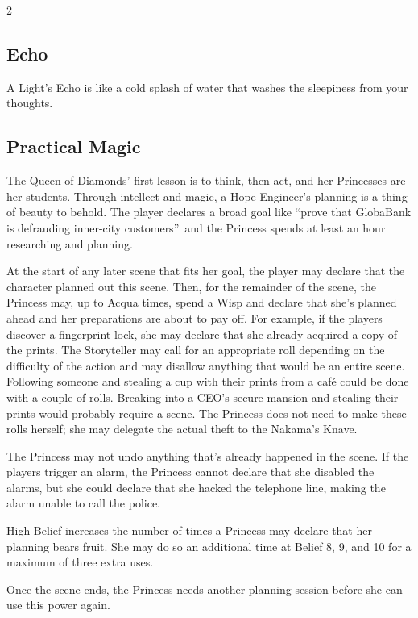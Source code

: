 \begin{multicols}{2}
\subsection*{Echo}
A Light's Echo is like a cold splash of water that washes the sleepiness from your thoughts.

\subsection*{Practical Magic}

The Queen of Diamonds' first lesson is to think, then act, and her Princesses are her students. Through intellect and magic, a Hope-Engineer's planning is a thing of beauty to behold. The player declares a broad goal like \textquotedblleft prove that GlobaBank is defrauding inner-city customers\textquotedblright\, and the Princess spends at least an hour researching and planning. 

At the start of any later scene that fits her goal, the player may declare that the character planned out this scene. Then, for the remainder of the scene, the Princess may, up to Acqua times, spend a Wisp and declare that she's planned ahead and her preparations are about to pay off. For example, if the players discover a fingerprint lock, she may declare that she already acquired a copy of the prints. The Storyteller may call for an appropriate roll depending on the difficulty of the action and may disallow anything that would be an entire scene. Following someone and stealing a cup with their prints from a caf\'{e} could be done with a couple of rolls. Breaking into a CEO's secure mansion and stealing their prints would probably require a scene. The Princess does not need to make these rolls herself; she may delegate the actual theft to the Nakama's Knave. 

The Princess may not undo anything that's already happened in the scene. If the players trigger an alarm, the Princess cannot declare that she disabled the alarms, but she could declare that she hacked the telephone line, making the alarm unable to call the police.

High Belief increases the number of times a Princess may declare that her planning bears fruit. She may do so an additional time at Belief 8, 9, and 10 for a maximum of three extra uses. 

Once the scene ends, the Princess needs another planning session before she can use this power again. 

\end{multicols}

